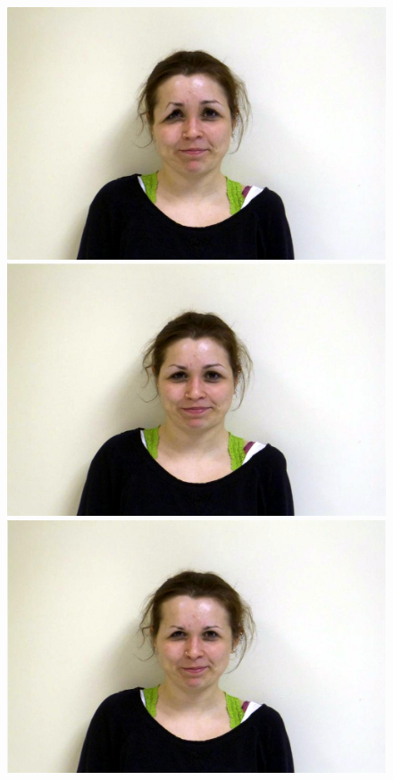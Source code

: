 \documentclass[11pt]{article}
\begin{document}
\begin{figure}[H]
\begin{center}
\includegraphics[scale=0.17]{figs/caricatures/fun_05.jpg}  
\includegraphics[scale=0.17]{figs/caricatures/fun_06.jpg}  
\includegraphics[scale=0.17]{figs/caricatures/fun_07.jpg}  

\end{center}
\end{figure}
\end{document}
